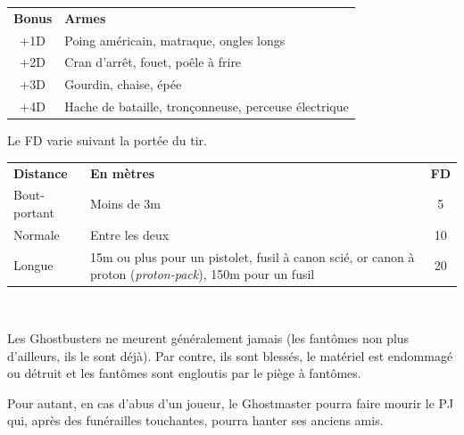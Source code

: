 \begin{frame}[b]
{\begin{minipage}[c][0.95\textheight][c]{\linewidth}
\begin{center}
\begin{tabular}{c p{6.5cm}}
\textbf{Bonus} & \textbf{Armes}\\
+1D & Poing américain, matraque, ongles longs \\
+2D & Cran d'arrêt, fouet, poêle à frire \\
+3D & Gourdin, chaise, épée \\
+4D & Hache de bataille, tronçonneuse, perceuse électrique \\
\end{tabular}
\end{center}



\myindent Le FD varie suivant la portée du tir.

\begin{center}
\begin{tabular}{l p{5.5cm} c}
\textbf{Distance} & \textbf{En mètres} & \textbf{FD} \\
Bout-portant & Moins de 3m & 5 \\
Normale & Entre les deux & 10 \\
Longue & 15m ou plus pour un pistolet, fusil à canon scié, or canon à proton (\textit{proton-pack}), 150m pour un fusil &  20 \\
\end{tabular} \\
\end{center}


\myindent Les Ghostbusters ne meurent généralement jamais (les fantômes non plus d'ailleurs, ils le sont déjà). Par contre, ils sont blessés, le matériel est endommagé ou détruit et les fantômes sont engloutis par le piège à fantômes.

\myindent Pour autant, en cas d'abus d'un joueur, le Ghostmaster pourra faire mourir le PJ qui, après des funérailles touchantes, pourra hanter ses anciens amis.


\end{minipage}}
\end{frame}
